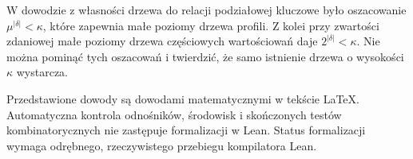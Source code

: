 \begin{uwaga}
\label{rem:lc39-inaccessible-usage}
W dowodzie z własności
drzewa do relacji podziałowej
kluczowe było oszacowanie
$\mu^{|\delta|}<\kappa$,
które zapewnia małe poziomy
drzewa profili.
Z kolei przy zwartości
zdaniowej małe poziomy
drzewa częściowych
wartościowań daje
$2^{|\delta|}<\kappa$.
Nie można pominąć
tych oszacowań i twierdzić,
że samo istnienie
drzewa o wysokości
$\kappa$ wystarcza.
\end{uwaga}

\begin{uwaga}
\label{rem:lc39-formal}
Przedstawione dowody są
dowodami matematycznymi
w tekście LaTeX.
Automatyczna kontrola
odnośników, środowisk
i skończonych testów
kombinatorycznych nie
zastępuje formalizacji
w Lean. Status formalizacji
wymaga odrębnego,
rzeczywistego przebiegu
kompilatora Lean.
\end{uwaga}
